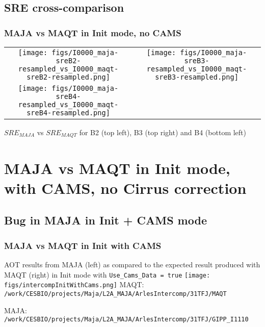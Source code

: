\documentclass[8pt]{beamer}
\begin{document}
\subsection{SRE cross-comparison}
\begin{frame}
\frametitle{MAJA vs MAQT in Init mode, no CAMS}
		\begin{tabular}{cc}
			\texttt{[image: figs/I0000\_maja-sreB2-resampled\_vs\_I0000\_maqt-sreB2-resampled.png]} & \texttt{[image: figs/I0000\_maja-sreB3-resampled\_vs\_I0000\_maqt-sreB3-resampled.png]} \\ 
			 
			\texttt{[image: figs/I0000\_maja-sreB4-resampled\_vs\_I0000\_maqt-sreB4-resampled.png]} &  \\ 
		\end{tabular} 
		
		$SRE_{MAJA}$ vs $SRE_{MAQT}$ for B2 (top left), B3 (top right) and B4 (bottom left)
\end{frame}



\section{MAJA vs MAQT in Init mode, with CAMS, no Cirrus correction}



\begin{frame}
\subsection{Bug in MAJA in Init + CAMS mode}
\frametitle{MAJA vs MAQT in Init with CAMS}
	AOT results from MAJA (left) as compared to the expected result produced with MAQT (right) in Init mode with \texttt{Use\_Cams\_Data = true}
	\texttt{[image: figs/intercompInitWithCams.png]}
	MAQT: \texttt{/work/CESBIO/projects/Maja/L2A\_MAJA/ArlesIntercomp/31TFJ/MAQT}
	
	MAJA: \texttt{/work/CESBIO/projects/Maja/L2A\_MAJA/ArlesIntercomp/31TFJ/GIPP\_I1110}

\end{frame}
\end{document}
